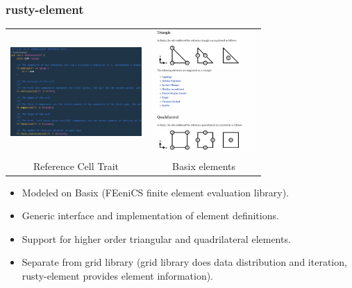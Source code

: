 \documentclass[dvipsnames,10pt]{beamer}
\begin{document}
\begin{frame}
\frametitle{rusty-element}

\begin{center}
\begin{tabular}{cc}
\includegraphics[width=5cm]{../figs/rusty_element} &
\includegraphics[width=4cm]{../figs/basix_elements}\\
Reference Cell Trait & {\small Basix elements}
\end{tabular}
\end{center}

\begin{itemize}
\item Modeled on Basix (FEeniCS finite element evaluation library).
\item Generic interface and implementation of element definitions.
\item Support for higher order triangular and quadrilateral elements.
\item Separate from grid library (grid library does data distribution and
iteration, rusty-element provides element information).
\end{itemize}

\end{frame}
\end{document}

